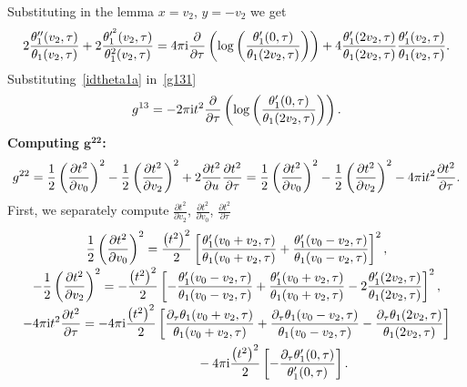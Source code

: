 \documentclass[10pt,a4paper]{amsart}
\numberwithin{equation}{section}
\begin{document}
Substituting in the lemma $x=v_2$, $y=-v_2$ we get
\begin{gather}
\label{idtheta1a}
2\frac{\theta_1^{\prime\prime}(v_2,\tau)}{\theta_1(v_2,\tau)} +2\frac{\theta_1^{\prime^2}(v_2,\tau)}{\theta_1^2(v_2,\tau)}
=4\pi {\rm i} \frac{\partial}{\partial \tau}\left(\log\left(\frac{\theta_1^{\prime}(0,\tau)}{\theta_1(2v_2,\tau)}\right)\right) +4\frac{\theta_1^{\prime}(2v_2,\tau)}{\theta_1(2v_2,\tau)} \frac{\theta_1^{\prime}(v_2,\tau)}{\theta_1(v_2,\tau)}.
\end{gather}
Substituting~\eqref{idtheta1a} in~\eqref{g131}
\begin{gather*}
g^{13}=-2\pi {\rm i} t^2 \frac{\partial}{\partial \tau}\left(\log\left(\frac{\theta_1^{\prime}(0,\tau)}{\theta_1(2v_2,\tau)}\right)\right).
\end{gather*}
\textbf{Computing $\boldsymbol {g^{22}}$:}
\begin{gather*}
g^{22}=\frac{1}{2}\left(\frac{\partial t^2}{\partial v_0}\right)^2-\frac{1}{2}\left(\frac{\partial t^2}{\partial v_2}\right)^2+2\frac{\partial t^2}{\partial u}\frac{\partial t^2}{\partial \tau}=\frac{1}{2}\left(\frac{\partial t^2}{\partial v_0}\right)^2-\frac{1}{2}\left(\frac{\partial t^2}{\partial v_2}\right)^2-4\pi {\rm i}t^2\frac{\partial t^2}{\partial \tau}.
\end{gather*}
First, we separately compute $\frac{\partial t^2}{\partial v_2}$, $\frac{\partial t^2}{\partial v_0}$, $\frac{\partial t^2}{\partial \tau}$
\begin{gather*}
\frac{1}{2}\left(\frac{\partial t^2}{\partial v_0}\right)^2=\frac{\big(t^2\big)^2}{2}\left[\frac{\theta_1^{\prime}(v_0+v_2,\tau)}{\theta_1(v_0+v_2,\tau)} +\frac{\theta_1^{\prime}(v_0-v_2,\tau)}{\theta_1(v_0-v_2,\tau)}\right]^2,
\\[-.5ex]
-\frac{1}{2}\left(\frac{\partial t^2}{\partial v_2}\right)^2 =-\frac{\big(t^2\big)^2}{2}\left[-\frac{\theta_1^{\prime}(v_0-v_2,\tau)}{\theta_1(v_0-v_2,\tau)} +\frac{\theta_1^{\prime}(v_0+v_2,\tau)}{\theta_1(v_0+v_2,\tau)} -2\frac{\theta_1^{\prime}(2v_2,\tau)}{\theta_1(2v_2,\tau)}\right]^2,
\\[-.5ex]
-4\pi {\rm i} t^2\frac{\partial t^2}{\partial \tau}=-4\pi {\rm i} \frac{\big(t^2\big)^2}{2}\left[\frac{\partial_{\tau}\theta_1(v_0+v_2,\tau)}{\theta_1(v_0+v_2,\tau)} +\frac{\partial_{\tau}\theta_1(v_0-v_2,\tau)}{\theta_1(v_0-v_2,\tau)} -\frac{\partial_{\tau}\theta_1(2v_2,\tau)}{\theta_1(2v_2,\tau)}\right]
\\ \hphantom{-4\pi {\rm i} t^2\frac{\partial t^2}{\partial \tau}=}
{}-4\pi {\rm i} \frac{\big(t^2\big)^2}{2}\left[-\frac{\partial_{\tau}\theta_1^{\prime}(0,\tau)}{\theta_1^{\prime}(0,\tau)}\right].
\end{gather*}
\end{document}
